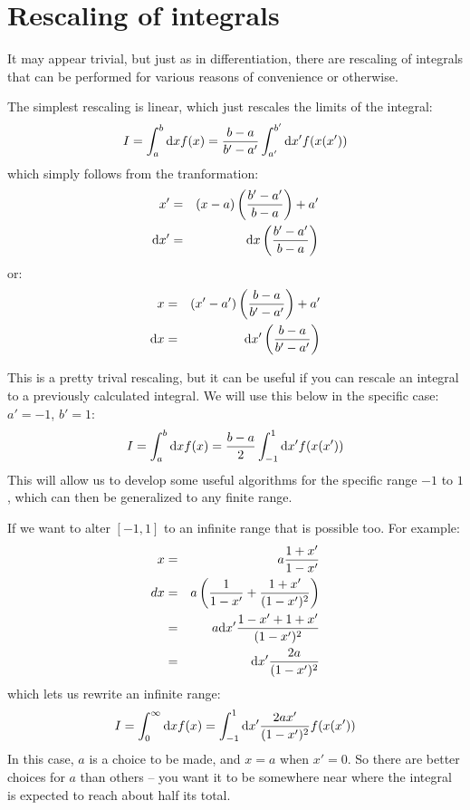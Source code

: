 \section{Rescaling of integrals}

It may appear trivial, but just as in differentiation, there are
rescaling of integrals that can be performed for various reasons of
convenience or otherwise. 

The simplest rescaling is linear, which just rescales the limits of
the integral:
\begin{equation}
 I = \int_a^b {\rm d}x f(x) = \frac{b-a}{b'-a'} \int_{a'}^{b'} {\rm d}x' f(x(x'))
\end{equation}
which simply follows from the tranformation:
\begin{eqnarray}
x' &=& (x-a) \left(\frac{b' - a'}{b-a}\right) + a' \cr
{\rm d}x' &=& {\rm d}x \left(\frac{b' - a'}{b-a}\right)
\end{eqnarray}
or:
\begin{eqnarray}
x &=& (x'-a') \left(\frac{b - a}{b'-a'}\right) + a' \cr
{\rm d}x &=& {\rm d}x' \left(\frac{b - a}{b'-a'}\right)
\end{eqnarray}

This is a pretty trival rescaling, but it can be useful if you can
rescale an integral to a previously calculated integral. We will use
this below in the specific case: $a'=-1$, $b'=1$:
\begin{equation}
 I = \int_a^b {\rm d}x f(x) = \frac{b-a}{2} \int_{-1}^{1} {\rm d}x' f(x(x'))
\end{equation}
This will allow us to develop some useful algorithms for the specific
range $-1$ to $1$, which can then be generalized to any finite range.

If we want to alter $[-1, 1]$ to an infinite range that is possible
too.  For example:
\begin{eqnarray}
x &=& a \frac{1+x'}{1-x'}  \cr
dx &=& a \left(\frac{1}{1-x'} + \frac{1+x'}{(1-x')^2}\right) \cr
&=& a {\rm d}x' \frac{1 -x' + 1 + x'}{(1-x')^2}  \cr
&=& {\rm d}x' \frac{2a}{(1-x')^2}  \cr
\end{eqnarray}
which lets us rewrite an infinite range:
\begin{equation}
 I = \int_0^\infty {\rm d}x f(x) = \int_{-1}^{1} {\rm d}x' \frac{2a
   x'}{(1-x')^2} f(x(x'))
\end{equation}
In this case, $a$ is a choice to be made, and $x=a$ when $x'=0$. So
there are better choices for $a$ than others -- you want it to be
somewhere near where the integral is expected to reach about half its
total.

